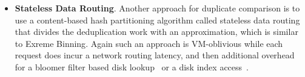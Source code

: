 \begin{itemize}


\item {\bf Stateless  Data Routing}.
Another approach for duplicate comparison  is to use a content-based hash
partitioning algorithm called stateless data routing~\cite{Dong20??}
that divides the deduplication work with an approximation, which 
is similar to Exreme Binning\cite{extreme_binning09}. 
Again such an approach is VM-oblivious while each request does incur a network routing latency, and then
additional overhead for a bloomer filter based  disk lookup~\cite{Dong20??} or 
a disk index access~\cite{extreme_binning09}. 
 

\end{itemize}

